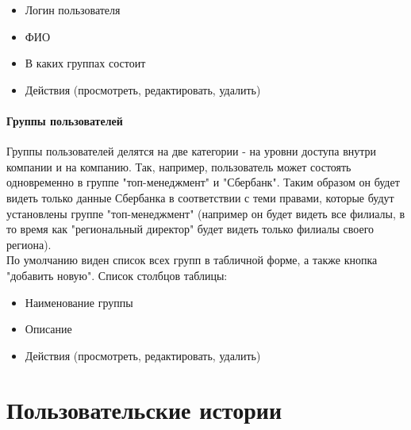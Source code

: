 \documentclass[DIV=calc, paper=a4, fontsize=11pt]{scrartcl} %
\begin{document}
\begin{itemize}
	\item Логин пользователя
	\item ФИО
	\item В каких группах состоит
	\item Действия (просмотреть, редактировать, удалить)
\end{itemize}

\paragraph{Группы пользователей}
Группы пользователей делятся на две категории - на уровни доступа внутри компании и на компанию. Так, например, пользователь может состоять одновременно в группе "топ-менеджмент" и "Сбербанк". Таким образом он будет видеть только данные Сбербанка в соответствии с теми правами, которые будут установлены группе "топ-менеджмент" (например он будет видеть все филиалы, в то время как "региональный директор" будет видеть только филиалы своего региона).
\\[0.5cm]
По умолчанию виден список всех групп в табличной форме, а также кнопка "добавить новую". Список столбцов таблицы:

\begin{itemize}
	\item Наименование группы
	\item Описание
	\item Действия (просмотреть, редактировать, удалить)
\end{itemize}

\section{Пользовательские истории}
\end{document}
